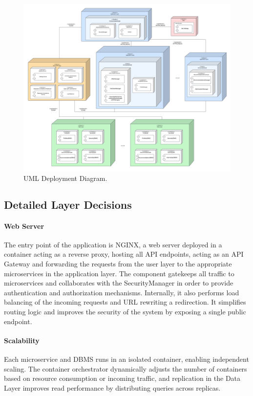 \begin{figure} [H]
    \begin{center}
        \includegraphics[width=0.95\linewidth]{LaTeXCode/images/DeploymentDiagram/deployment_view.png}
        \caption{UML Deployment Diagram.}
        \label{fig: deployment_diagram}
    \end{center}
\end{figure}

\subsection{Detailed Layer Decisions}
\label{subsec: layer_description}

\paragraph{Web Server}
The entry point of the application is NGINX, a web server deployed in a container acting as a reverse proxy, hosting all API endpoints, acting as an API Gateway and forwarding the requests from the user layer to the appropriate microservices in the application layer. 
The component gatekeeps all traffic to microservices and collaborates with the SecurityManager in order to provide authentication and authorization mechanisms.
Internally, it also performs load balancing of the incoming requests and URL rewriting a redirection. 
It simplifies routing logic and improves the security of the system by exposing a single public endpoint.

\paragraph{Scalability}
Each microservice and DBMS runs in an isolated container, enabling independent scaling. The container orchestrator dynamically adjusts the number of containers based on resource consumption or incoming traffic, and replication in the Data Layer improves read performance by distributing queries across replicas.

